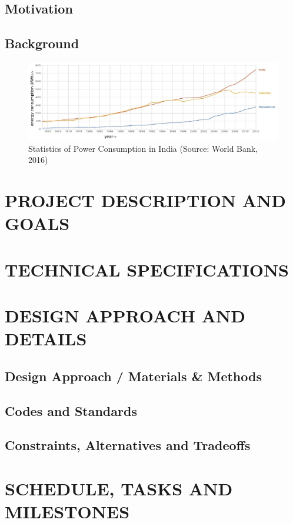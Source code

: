 \documentclass[a4paper,12pt,bibliography=totocnumbered]{report}
\begin{document}
	\section{Motivation}
	\Blindtext
	\section{Background}\label{background}
	\Blindtext

	\begin{figure}[h]
		\centering
		\includegraphics[width=\linewidth]{power_consumption_graph}
		\caption{Statistics of Power Consumption in India (Source: World Bank, 2016) \cite{raghu2017assessing}}
		\label{power_consumption_graph}
	\end{figure}
	\clearpage
	\chapter{PROJECT DESCRIPTION AND GOALS}
	\Blindtext
	\chapter{TECHNICAL SPECIFICATIONS}
	\Blindtext
	
	\chapter{DESIGN APPROACH AND DETAILS}
	\section{Design Approach / Materials \& Methods}
	\Blindtext
	\section{Codes and Standards}
	\Blindtext
	\section{Constraints, Alternatives and Tradeoffs}
	\Blindtext
	\chapter{SCHEDULE, TASKS AND MILESTONES}
	\Blindtext
	
\end{document}
